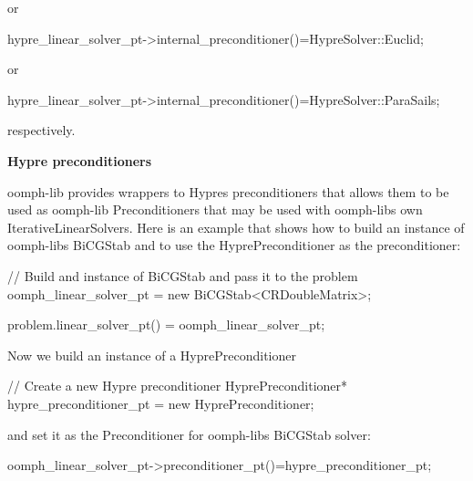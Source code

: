 or


\begin{DoxyCodeInclude}
       hypre\_linear\_solver\_pt->internal\_preconditioner()=HypreSolver::Euclid;

\end{DoxyCodeInclude}
 or


\begin{DoxyCodeInclude}
       hypre\_linear\_solver\_pt->internal\_preconditioner()=HypreSolver::ParaSails;

\end{DoxyCodeInclude}


respectively.

{\bfseries Hypre preconditioners}

{\ttfamily oomph-\/lib} provides wrappers to {\ttfamily Hypre\textquotesingle{}s} preconditioners that allows them to be used as {\ttfamily oomph-\/lib} {\ttfamily Preconditioners} that may be used with {\ttfamily oomph-\/lib\textquotesingle{}s} own {\ttfamily Iterative\+Linear\+Solvers}. Here is an example that shows how to build an instance of {\ttfamily oomph-\/lib\textquotesingle{}s} {\ttfamily Bi\+C\+G\+Stab} and to use the {\ttfamily Hypre\+Preconditioner} as the preconditioner\+:

 
\begin{DoxyCodeInclude}
 \textcolor{comment}{// Build and instance of BiCGStab and pass it to the problem}
 oomph\_linear\_solver\_pt = \textcolor{keyword}{new} BiCGStab<CRDoubleMatrix>;

 problem.linear\_solver\_pt() = oomph\_linear\_solver\_pt;

\end{DoxyCodeInclude}


Now we build an instance of a {\ttfamily Hypre\+Preconditioner} 

 
\begin{DoxyCodeInclude}
 \textcolor{comment}{// Create a new Hypre preconditioner}
 HyprePreconditioner* hypre\_preconditioner\_pt = \textcolor{keyword}{new} HyprePreconditioner;

\end{DoxyCodeInclude}


and set it as the {\ttfamily Preconditioner} for {\ttfamily oomph-\/lib\textquotesingle{}s} {\ttfamily Bi\+C\+G\+Stab} solver\+:


\begin{DoxyCodeInclude}
   oomph\_linear\_solver\_pt->preconditioner\_pt()=hypre\_preconditioner\_pt;

\end{DoxyCodeInclude}


